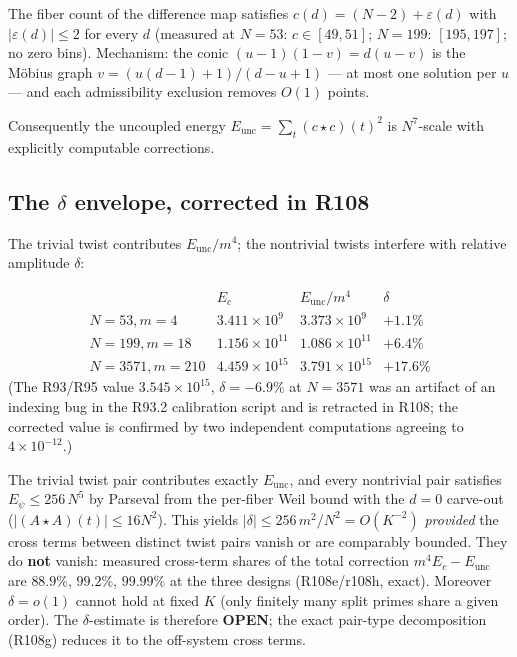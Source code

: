\begin{theorem}[flatness]
\label{thm:flatness}
The fiber count of the difference map satisfies
$c(d) = (N{-}2) + \varepsilon(d)$ with $|\varepsilon(d)| \le 2$ for
every $d$ (measured at $N = 53$: $c \in [49,51]$; $N = 199$:
$[195,197]$; no zero bins).  Mechanism: the conic
$(u{-}1)(1{-}v) = d(u{-}v)$ is the M\"obius graph
$v = (u(d{-}1)+1)/(d{-}u+1)$ — at most one solution per $u$ — and each
admissibility exclusion removes $O(1)$ points.
\end{theorem}

Consequently the uncoupled energy $E_{\mathrm{unc}} =
\sum_t (c \star c)(t)^2$ is $N^7$-scale with explicitly computable
corrections.

\subsection{The \texorpdfstring{$\delta$}{delta} envelope, corrected in R108}

The trivial twist contributes $E_{\mathrm{unc}}/m^4$; the nontrivial
twists interfere with relative amplitude $\delta$:

\[
\begin{array}{lccc}
 & E_c & E_{\mathrm{unc}}/m^4 & \delta\\
N = 53, m = 4 & 3.411 \times 10^9 & 3.373 \times 10^9 & +1.1\%\\
N = 199, m = 18 & 1.156 \times 10^{11} & 1.086 \times 10^{11} & +6.4\%\\
N = 3571, m = 210 & 4.459 \times 10^{15} & 3.791 \times 10^{15} & +17.6\%
\end{array}
\]
(The R93/R95 value $3.545 \times 10^{15}$, $\delta = -6.9\%$ at
$N = 3571$ was an artifact of an indexing bug in the R93.2 calibration
script and is retracted in R108; the corrected value is confirmed by
two independent computations agreeing to $4 \times 10^{-12}$.)

\begin{theorem}
\label{thm:delta}
The trivial twist pair contributes exactly $E_{\mathrm{unc}}$, and every
nontrivial pair satisfies $E_{\psi} \le 256\,N^5$ by Parseval from the
per-fiber Weil bound with the $d{=}0$ carve-out
($|(A \star A)(t)| \le 16 N^2$).  This yields
$|\delta| \le 256\,m^2/N^2 = O(K^{-2})$ \emph{provided} the cross
terms between distinct twist pairs vanish or are comparably bounded.
They do \textbf{not} vanish: measured cross-term shares of the total
correction $m^4 E_c - E_{\mathrm{unc}}$ are $88.9\%$, $99.2\%$,
$99.99\%$ at the three designs (R108e/r108h, exact).  Moreover
$\delta = o(1)$ cannot hold at fixed $K$ (only finitely many split
primes share a given order).  The $\delta$-estimate is therefore
\textbf{OPEN}; the exact pair-type decomposition (R108g) reduces it to
the off-system cross terms.
\end{theorem}

